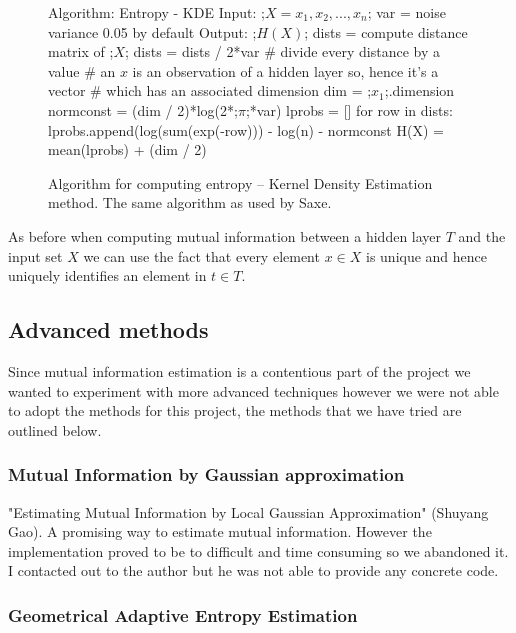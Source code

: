 \documentclass[dissertation.tex]{subfiles}
\begin{document}
\begin{figure}[H]
    \begin{pythonfigure}
      Algorithm: Entropy - KDE
      Input: 
      ;$X = x_1, x_2,...,x_n$;  
      var = noise variance 0.05 by default
      Output: ;$H(X)$;
      dists = compute distance matrix of ;$X$;
      dists = dists / 2*var # divide every distance by a value
      # an $x$ is an observation of a hidden layer so, hence it's a vector 
      # which has an associated dimension
      dim = ;$x_1$;.dimension
      normconst = (dim / 2)*log(2*;$\pi$;*var)
      lprobs = []
      for row in dists:
        lprobs.append(log(sum(exp(-row))) - log(n) - normconst
      H(X) = mean(lprobs) + (dim / 2)
    \end{pythonfigure}
    \caption{Algorithm for computing entropy -- Kernel Density Estimation method.
    The same algorithm as used by Saxe.}
    \label{fig:entropy3}
\end{figure} 

As before when computing mutual information between a hidden layer $T$ and the
input set $X$ we can use the fact that every element $x\in X$ is unique and
hence uniquely identifies an element in $t\in T$.

\subsection{Advanced methods} \label{ssection:advanced}

Since mutual information estimation is a contentious part of the project we
wanted to experiment with more advanced techniques however we were not able to
adopt the methods for this project, the methods that we have tried are outlined
below.

\subsubsection{Mutual Information by Gaussian approximation}
  
  "Estimating Mutual Information by Local Gaussian Approximation" (Shuyang Gao). A
  promising way to estimate mutual information. However the implementation
  proved to be to difficult and time consuming so we abandoned it. I contacted
  out to the author but he was not able to provide any concrete code.

\subsubsection{Geometrical Adaptive Entropy Estimation}
\end{document}
